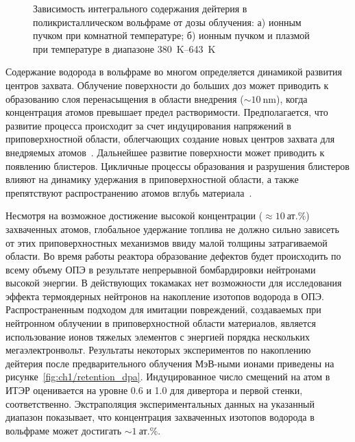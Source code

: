\begin{figure}[ht]
    \caption{Зависимость интегрального содержания дейтерия в поликристаллическом вольфраме от дозы облучения: а) ионным пучком при комнатной температуре; б) ионным пучком и плазмой при температуре в диапазоне \SIrange{380}{643}{\kelvin}~\cite{HarutunyanThesis}}\label{fig:ch1/retention_fluence}
\end{figure}

Содержание водорода в вольфраме во многом определяется динамикой развития центров захвата. Облучение поверхности до больших доз может приводить к образованию слоя перенасыщения в области внедрения (\( \sim \SI{10}{\nano\meter} \)), когда концентрация атомов превышает предел растворимости. Предполагается, что развитие процесса происходит за счет индуцирования напряжений в приповерхностной области, облегчающих создание новых центров захвата для внедряемых атомов~\cite{Nishijima2023}. Дальнейшее развитие поверхности может приводить к появлению блистеров. Цикличные процессы образования и разрушения блистеров влияют на динамику удержания в приповерхностной области, а также препятствуют распространению атомов вглубь материала~\cite{Bauer2017}.  

Несмотря на возможное достижение высокой концентрации (\( \approx \SI{10}{\text{ат.}\percent} \)) захваченных атомов, глобальное удержание топлива не должно сильно зависеть от этих приповерхностных механизмов ввиду малой толщины затрагиваемой области. Во время работы реактора образование дефектов будет происходить по всему объему ОПЭ в результате непрерывной бомбардировки нейтронами высокой энергии. В действующих токамаках нет возможности для исследования эффекта термоядерных нейтронов на накопление изотопов водорода в ОПЭ. Распространенным подходом для имитации повреждений, создаваемых при нейтронном облучении в приповерхностной области материалов, является использование ионов тяжелых элементов с энергией порядка нескольких мегаэлектронвольт. Результаты некоторых экспериментов по накоплению дейтерия после предварительного облучения МэВ-ными ионами приведены на рисунке~\cref{fig:ch1/retention_dpa}. Индуцированное число смещений на атом в ИТЭР оценивается на уровне \num{0.6} и \num{1.0} для дивертора и первой стенки, соответственно. Экстраполяция экспериментальных данных на указанный диапазон показывает, что концентрация захваченных изотопов водорода в вольфраме может достигать \( \sim \SI{1}{\text{ат.}\percent} \). 

